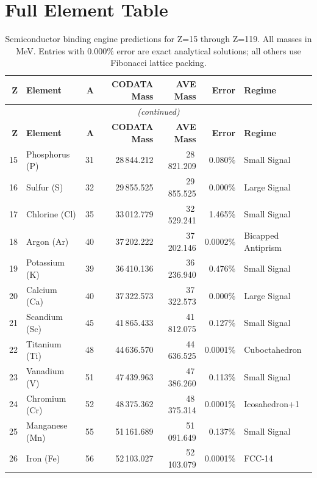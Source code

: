 \section{Full Element Table}

\begin{small}
\begin{longtable}{r l r r r r l}
\caption{Semiconductor binding engine predictions for Z=15 through Z=119. All masses in MeV. Entries with $0.000\%$ error are exact analytical solutions; all others use Fibonacci lattice packing.}\label{tab:heavy_catalog}\\
\toprule
\textbf{Z} & \textbf{Element} & \textbf{A} & \textbf{CODATA Mass} & \textbf{AVE Mass} & \textbf{Error} & \textbf{Regime} \\
\midrule
\endfirsthead
\multicolumn{7}{c}{\textit{(continued)}}\\
\toprule
\textbf{Z} & \textbf{Element} & \textbf{A} & \textbf{CODATA Mass} & \textbf{AVE Mass} & \textbf{Error} & \textbf{Regime} \\
\midrule
\endhead
\bottomrule
\endfoot
15 & Phosphorus (P)  & 31 & 28\,844.212 & 28\,821.209 & 0.080\% & Small Signal \\
16 & Sulfur (S)      & 32 & 29\,855.525 & 29\,855.525 & 0.000\% & Large Signal \\
17 & Chlorine (Cl)   & 35 & 33\,012.779 & 32\,529.241 & 1.465\% & Small Signal \\
18 & Argon (Ar)      & 40 & 37\,202.222 & 37\,202.146 & 0.0002\% & Bicapped Antiprism \\
\midrule
19 & Potassium (K)   & 39 & 36\,410.136 & 36\,236.940 & 0.476\% & Small Signal \\
20 & Calcium (Ca)    & 40 & 37\,322.573 & 37\,322.573 & 0.000\% & Large Signal \\
21 & Scandium (Sc)   & 45 & 41\,865.433 & 41\,812.075 & 0.127\% & Small Signal \\
22 & Titanium (Ti)   & 48 & 44\,636.570 & 44\,636.525 & 0.0001\% & Cuboctahedron \\
23 & Vanadium (V)    & 51 & 47\,439.963 & 47\,386.260 & 0.113\% & Small Signal \\
24 & Chromium (Cr)   & 52 & 48\,375.362 & 48\,375.314 & 0.0001\% & Icosahedron+1 \\
25 & Manganese (Mn)  & 55 & 51\,161.689 & 51\,091.649 & 0.137\% & Small Signal \\
26 & Iron (Fe)       & 56 & 52\,103.027 & 52\,103.079 & 0.0001\% & FCC-14 \\

\end{longtable}
\end{small}
